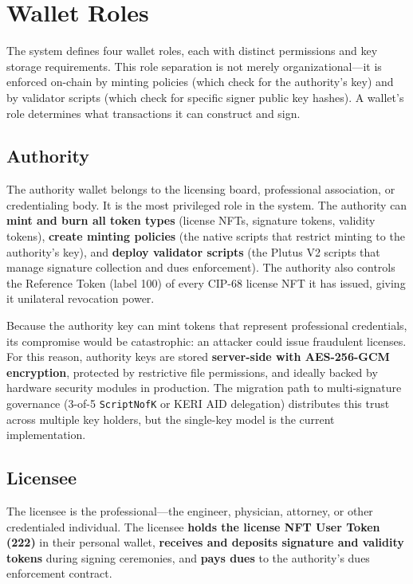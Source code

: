 \section{Wallet Roles}
\label{sec:ch5-wallets}

The system defines four wallet roles, each with distinct permissions and key storage requirements. This role separation is not merely organizational---it is enforced on-chain by minting policies (which check for the authority's key) and by validator scripts (which check for specific signer public key hashes). A wallet's role determines what transactions it can construct and sign.

\subsection{Authority}

The authority wallet belongs to the licensing board, professional association, or credentialing body. It is the most privileged role in the system. The authority can \textbf{mint and burn all token types} (license NFTs, signature tokens, validity tokens), \textbf{create minting policies} (the native scripts that restrict minting to the authority's key), and \textbf{deploy validator scripts} (the Plutus V2 scripts that manage signature collection and dues enforcement). The authority also controls the Reference Token (label 100) of every CIP-68 license NFT it has issued, giving it unilateral revocation power.

Because the authority key can mint tokens that represent professional credentials, its compromise would be catastrophic: an attacker could issue fraudulent licenses. For this reason, authority keys are stored \textbf{server-side with AES-256-GCM encryption}, protected by restrictive file permissions, and ideally backed by hardware security modules in production. The migration path to multi-signature governance (3-of-5 \texttt{ScriptNofK} or KERI AID delegation) distributes this trust across multiple key holders, but the single-key model is the current implementation.

\subsection{Licensee}

The licensee is the professional---the engineer, physician, attorney, or other credentialed individual. The licensee \textbf{holds the license NFT User Token (222)} in their personal wallet, \textbf{receives and deposits signature and validity tokens} during signing ceremonies, and \textbf{pays dues} to the authority's dues enforcement contract.

